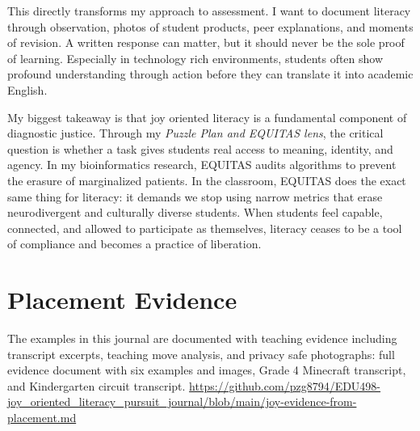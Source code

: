 \documentclass[11pt]{article}
\begin{document}
This directly transforms my approach to assessment. I want to document literacy through observation, photos of student products, peer explanations, and moments of revision. A written response can matter, but it should never be the sole proof of learning. Especially in technology rich environments, students often show profound understanding through action before they can translate it into academic English.

My biggest takeaway is that joy oriented literacy is a fundamental component of diagnostic justice. Through my \textit{Puzzle Plan and EQUITAS lens}, the critical question is whether a task gives students real access to meaning, identity, and agency. In my bioinformatics research, EQUITAS audits algorithms to prevent the erasure of marginalized patients. In the classroom, EQUITAS does the exact same thing for literacy: it demands we stop using narrow metrics that erase neurodivergent and culturally diverse students. When students feel capable, connected, and allowed to participate as themselves, literacy ceases to be a tool of compliance and becomes a practice of liberation.

\section*{Placement Evidence}

The examples in this journal are documented with teaching evidence including transcript excerpts, teaching move analysis, and privacy safe photographs: full evidence document with six examples and images, Grade 4 Minecraft transcript, and Kindergarten circuit transcript. \url{https://github.com/pzg8794/EDU498-joy_oriented_literacy_pursuit_journal/blob/main/joy-evidence-from-placement.md}
\end{document}
